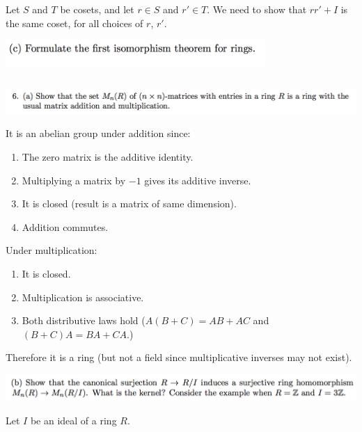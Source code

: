 \documentclass[12pt]{article}
\begin{document}
Let $S$ and $T$ be cosets, and let $r \in S$ and $r' \in T$. We need to show that $rr' + I$ is the
same coset, for all choices of $r$, $r'$.

\newpage
\begin{mdframed}
\includegraphics[width=280pt]{img/linear-algebra-a0-1-5-c.png}\\
\end{mdframed}

\newpage
\subsection*{} %
\begin{mdframed}
\includegraphics[width=400pt]{img/linear-algebra-a0-1-6-a.png}\\
\end{mdframed}
It is an abelian group under addition since:
\begin{enumerate}
\item The zero matrix is the additive identity.
\item Multiplying a matrix by $-1$ gives its additive inverse.
\item It is closed (result is a matrix of same dimension).
\item Addition commutes.
\end{enumerate}

Under multiplication:
\begin{enumerate}
\item It is closed.
\item Multiplication is associative.
\item Both distributive laws hold ($A(B + C) = AB + AC$ and $(B + C)A = BA + CA$.)
\end{enumerate}

Therefore it is a ring (but not a field since multiplicative inverses may not exist).

\begin{mdframed}
\includegraphics[width=400pt]{img/linear-algebra-a0-1-6-b.png}\\
\end{mdframed}
Let $I$ be an ideal of a ring $R$.
\end{document}
